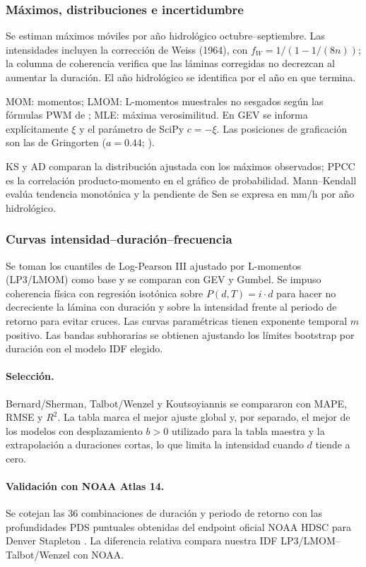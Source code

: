 \subsubsection{Máximos, distribuciones e incertidumbre}
Se estiman máximos móviles por año hidrológico octubre--septiembre. Las intensidades incluyen la corrección de Weiss
(1964), con $f_W = 1/(1 - 1/(8n))$; la columna de coherencia verifica que las láminas corregidas no decrezcan al
aumentar la duración. El año hidrológico se identifica por el año en que termina.

MOM: momentos; LMOM: L-momentos muestrales no sesgados según las fórmulas PWM de \citet{hosking1997}; MLE: máxima
verosimilitud. En GEV se informa explícitamente $\xi$ y el parámetro de SciPy $c = -\xi$. Las posiciones de
graficación son las de Gringorten ($a = 0.44$; \citealp{gringorten1963}).

KS y AD comparan la distribución ajustada con los máximos observados; PPCC es la correlación producto-momento en el
gráfico de probabilidad. Mann--Kendall \citep{mann1945} evalúa tendencia monotónica y la pendiente de Sen \citep{sen1968} se expresa en mm/h por año
hidrológico.

\subsubsection{Curvas intensidad--duración--frecuencia}
Se toman los cuantiles de Log-Pearson III ajustado por L-momentos (LP3/LMOM) como base y se comparan con GEV y Gumbel.
Se impuso coherencia física con regresión isotónica sobre $P(d,T)=i\cdot d$ para hacer no decreciente la lámina con
duración y sobre la intensidad frente al periodo de retorno para evitar cruces. Las curvas paramétricas tienen
exponente temporal $m$ positivo. Las bandas subhorarias se obtienen ajustando los límites bootstrap por duración con
el modelo IDF elegido.

\paragraph{Selección.} Bernard/Sherman, Talbot/Wenzel y Koutsoyiannis \citep{koutsoyiannis1998} se compararon con MAPE, RMSE y $R^2$. La tabla
marca el mejor ajuste global y, por separado, el mejor de los modelos con desplazamiento $b>0$ utilizado para la tabla
maestra y la extrapolación a duraciones cortas, lo que limita la intensidad cuando $d$ tiende a cero.

\paragraph{Validación con NOAA Atlas 14.} Se cotejan las 36 combinaciones de duración y periodo de retorno con las
profundidades PDS puntuales obtenidas del endpoint oficial NOAA HDSC para Denver Stapleton \citep{perica2013}. La diferencia relativa
compara nuestra IDF LP3/LMOM--Talbot/Wenzel con NOAA.

